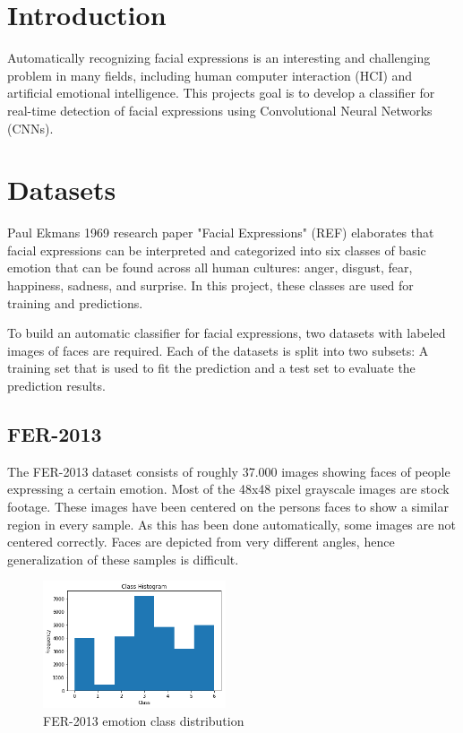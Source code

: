 \documentclass[twoside]{article}
\begin{document}
\begin{multicols}{2} %

\section{Introduction}

Automatically recognizing facial expressions is an interesting and challenging problem in many fields, including human computer interaction (HCI) and artificial emotional intelligence. This projects goal is to develop a classifier for real-time detection of facial expressions using Convolutional Neural Networks (CNNs).


\section{Datasets}

Paul Ekmans 1969 research paper "Facial Expressions" (REF) elaborates that facial expressions can be interpreted and categorized into six classes of basic emotion that can be found across all human cultures: anger, disgust, fear, happiness, sadness, and surprise. In this project, these classes are used for training and predictions.

To build an automatic classifier for facial expressions, two datasets with labeled images of faces are required. Each of the datasets is split into two subsets: A training set that is used to fit the prediction and a test set to evaluate the prediction results.


\subsection{FER-2013}

The FER-2013 dataset consists of roughly 37.000 images showing faces of people expressing a certain emotion. Most of the 48x48 pixel grayscale images are stock footage. These images have been centered on the persons faces to show a similar region in every sample. As this has been done automatically, some images are not centered correctly. Faces are depicted from very different angles, hence generalization of these samples is difficult. 

\begin{figure}[H]
	\includegraphics[width=0.48\textwidth]{class_dist}
	\caption{FER-2013 emotion class distribution}
\end{figure}


\end{multicols}
\end{document}
